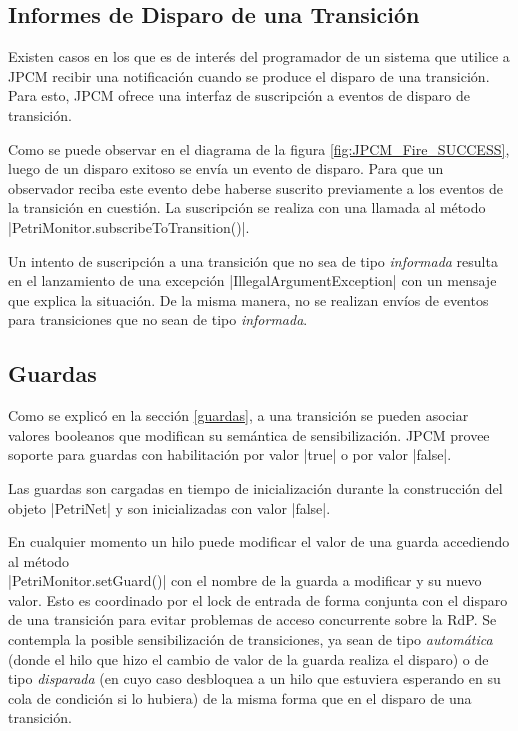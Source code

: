 \subsection{Informes de Disparo de una Transición}

Existen casos en los que es de interés del programador de un sistema que
utilice a JPCM recibir una notificación cuando se produce el disparo de una
transición. Para esto, JPCM ofrece una interfaz de suscripción a eventos de
disparo de transición.

Como se puede observar en el diagrama de la figura \ref{fig:JPCM_Fire_SUCCESS},
luego de un disparo exitoso se envía un evento de disparo. Para que un
observador reciba este evento debe haberse suscrito previamente a los eventos de
la transición en cuestión. La suscripción se realiza con una llamada al método
|PetriMonitor.subscribeToTransition()|.

Un intento de suscripción a una transición que no sea de tipo \textit{informada}
resulta en el lanzamiento de una excepción |IllegalArgumentException|
con un mensaje que explica la situación. De la misma manera, no se realizan
envíos de eventos para transiciones que no sean de tipo \textit{informada}.

\subsection{Guardas}

Como se explicó en la sección \ref{guardas}, a una transición se pueden asociar
valores booleanos que modifican su semántica de sensibilización. JPCM provee
soporte para guardas con habilitación por valor |true| o por valor
|false|.

Las guardas son cargadas en tiempo de inicialización durante la construcción
del objeto |PetriNet| y son inicializadas con valor
|false|.

En cualquier momento un hilo puede modificar el valor de una guarda accediendo
al método\\ |PetriMonitor.setGuard()| con el nombre de la guarda a
modificar y su nuevo valor. Esto es coordinado por el lock de entrada de forma
conjunta con el disparo de una transición para evitar problemas de acceso
concurrente sobre la RdP. Se contempla la posible sensibilización de
transiciones, ya sean de tipo \textit{automática} (donde el hilo que hizo el
cambio de valor de la guarda realiza el disparo) o de tipo \textit{disparada}
(en cuyo caso desbloquea a un hilo que estuviera esperando en su cola de
condición si lo hubiera) de la misma forma que en el disparo de una transición.
